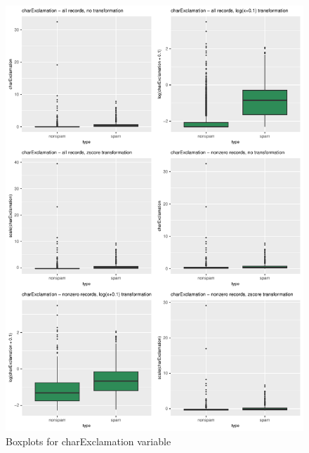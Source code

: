 \documentclass{article}\usepackage[]{graphicx}\usepackage[]{xcolor}
\makeatletter
\def\maxwidth{ %
  \ifdim\Gin@nat@width>\linewidth
    \linewidth
  \else
    \Gin@nat@width
  \fi
}
\newenvironment{knitrout}{}{} %
\makeatother
\begin{document}
\begin{knitrout}
\color{fgcolor}\begin{figure}[h]
\includegraphics[width=\maxwidth]{figure/charExclamationBox-1} \caption[\label{fig4} Boxplots for charExclamation variable]{\label{fig4} Boxplots for charExclamation variable}\label{fig:charExclamationBox}
\end{figure}

\end{knitrout}
\end{document}
